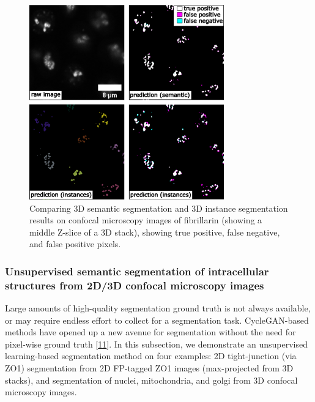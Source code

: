 \begin{figure}
\hypertarget{fig:3dseg}{%
\centering
\includegraphics[width=0.75\textwidth,height=\textheight]{images/semantic_seg3d_justin.png}
\caption{Comparing 3D semantic segmentation and 3D instance segmentation results on confocal microscopy images of fibrillarin (showing a middle Z-slice of a 3D stack), showing true positive, false negative, and false positive pixels.}\label{fig:3dseg}
}
\end{figure}

\hypertarget{unsupervised-semantic-segmentation-of-intracellular-structures-from-2d3d-confocal-microscopy-images}{%
\subsubsection{Unsupervised semantic segmentation of intracellular structures from 2D/3D confocal microscopy images}\label{unsupervised-semantic-segmentation-of-intracellular-structures-from-2d3d-confocal-microscopy-images}}

Large amounts of high-quality segmentation ground truth is not always available, or may require endless effort to collect for a segmentation task. CycleGAN-based methods have opened up a new avenue for segmentation without the need for pixel-wise ground truth {[}\protect\hyperlink{ref-RuFP3CS3}{11}{]}. In this subsection, we demonstrate an unsupervised learning-based segmentation method on four examples: 2D tight-junction (via ZO1) segmentation from 2D FP-tagged ZO1 images (max-projected from 3D stacks), and segmentation of nuclei, mitochondria, and golgi from 3D confocal microscopy images.

